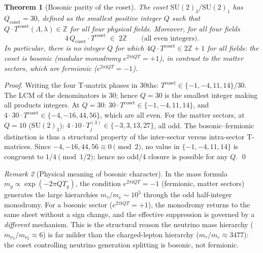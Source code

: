 \documentclass[11pt,a4paper]{article}
\newtheorem{theorem}{Theorem}[section]
\theoremstyle{definition}\newtheorem{definition}[theorem]{Definition}
\theoremstyle{remark}
\newtheorem{remark}[theorem]{Remark}
\newcommand{\SU}{\mathrm{SU}}
\begin{document}
\begin{theorem}[Bosonic parity of the coset]
\label{P17:thm:coset_bosonic}
The coset $\SU(2)_3/\SU(2)_1$ has $Q_{\mathrm{coset}}=30$, defined
as the smallest positive integer $Q$ such that
$Q\cdot T^{\mathrm{coset}}(\Lambda,\lambda)\in\mathbb{Z}$
for all four physical fields. Moreover, for all four fields
\begin{equation}
  4\,Q_{\mathrm{coset}}\cdot T^{\mathrm{coset}} \;\in\; 2\mathbb{Z}
  \qquad\text{(all even integers)}.
  \label{P17:eq:coset_bosonic}
\end{equation}
In particular, there is no integer $Q$ for which
$4Q\cdot T^{\mathrm{coset}}\in 2\mathbb{Z}+1$ for all fields: the
coset is \emph{bosonic} (modular monodromy $e^{2\pi\mathrm{i}QT}=+1$),
in contrast to the matter sectors, which are \emph{fermionic}
($e^{2\pi\mathrm{i}QT}=-1$).
\end{theorem}

\begin{proof}
Writing the four T-matrix phases in 30ths:
$T^{\mathrm{coset}}\in\{-1,-4,11,14\}/30$.
The LCM of the denominators is $30$; hence $Q=30$ is the smallest
integer making all products integers.  At $Q=30$:
$30\cdot T^{\mathrm{coset}}\in\{-1,-4,11,14\}$, and
$4\cdot 30\cdot T^{\mathrm{coset}}\in\{-4,-16,44,56\}$, which are
all even.  For the matter sectors, at $Q=10$ ($\SU(2)_3$):
$4\cdot10\cdot T_j^{(3)}\in\{-3,3,13,27\}$, all odd.
The bosonic--fermionic distinction is thus a structural property of
the inter-sector versus intra-sector T-matrices.  Since
$-4,-16,44,56\equiv0\pmod{2}$, no value in $\{-1,-4,11,14\}$ is
congruent to $1/4\pmod{1/2}$; hence no odd/4 closure is possible
for any $Q$.
\qed
\end{proof}

\begin{remark}[Physical meaning of bosonic character]
\label{P17:rem:bosonic_meaning}
In the mass formula $m_g\propto\exp(-2\pi Q T_g)$, the condition
$e^{2\pi\mathrm{i}QT}=-1$ (fermionic, matter sectors) generates
the large hierarchies $m_\tau/m_e\sim10^5$ through the odd
half-integer monodromy.  For a bosonic sector
($e^{2\pi\mathrm{i}QT}=+1$), the monodromy returns to the same
sheet without a sign change, and the effective suppression is
governed by a \emph{different} mechanism.  This is the structural
reason the neutrino mass hierarchy
($m_{\nu_3}/m_{\nu_2}\approx6$) is far milder than the charged-lepton
hierarchy ($m_\tau/m_e\approx3477$): the coset controlling neutrino
generation splitting is bosonic, not fermionic.
\end{remark}
\end{document}
